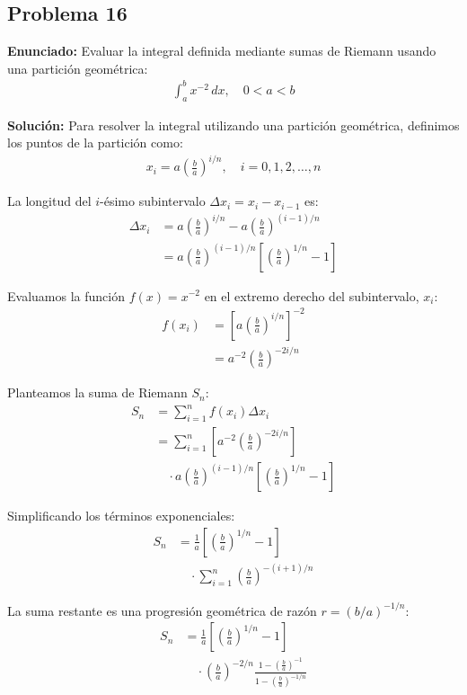 \subsection*{Problema 16}

\textbf{Enunciado:} Evaluar la integral definida 
mediante sumas de Riemann usando una partición geométrica:
\begin{align*}
\int_{a}^{b} x^{-2} \, dx, \quad 0 < a < b
\end{align*}

\textbf{Solución:} Para resolver la integral 
utilizando una partición geométrica, 
definimos los puntos de la partición como:
\begin{align*}
x_i = a \left(\frac{b}{a}\right)^{i/n}, \quad i = 0, 1, 2, \dots, n
\end{align*}

La longitud del $i$-ésimo subintervalo 
$\Delta x_i = x_i - x_{i-1}$ es:
\begin{align*}
\Delta x_i &= a \left(\frac{b}{a}\right)^{i/n} 
- a \left(\frac{b}{a}\right)^{(i-1)/n} \\
&= a \left(\frac{b}{a}\right)^{(i-1)/n} 
\left[ \left(\frac{b}{a}\right)^{1/n} - 1 \right]
\end{align*}

Evaluamos la función $f(x) = x^{-2}$ 
en el extremo derecho del subintervalo, $x_i$:
\begin{align*}
f(x_i) &= \left[ a \left(\frac{b}{a}\right)^{i/n} \right]^{-2} \\
&= a^{-2} \left(\frac{b}{a}\right)^{-2i/n}
\end{align*}

Planteamos la suma de Riemann $S_n$:
\begin{align*}
S_n &= \sum_{i=1}^{n} f(x_i) \Delta x_i \\
&= \sum_{i=1}^{n} \left[ a^{-2} \left(\frac{b}{a}\right)^{-2i/n} \right] \\
&\quad \cdot a \left(\frac{b}{a}\right)^{(i-1)/n} 
\left[ \left(\frac{b}{a}\right)^{1/n} - 1 \right]
\end{align*}

Simplificando los términos exponenciales:
\begin{align*}
S_n &= \frac{1}{a} \left[ \left(\frac{b}{a}\right)^{1/n} - 1 \right] \\
&\quad \cdot \sum_{i=1}^{n} \left(\frac{b}{a}\right)^{-(i+1)/n}
\end{align*}

La suma restante es una progresión geométrica 
de razón $r = (b/a)^{-1/n}$:
\begin{align*}
S_n &= \frac{1}{a} \left[ \left(\frac{b}{a}\right)^{1/n} - 1 \right] \\
&\quad \cdot \left(\frac{b}{a}\right)^{-2/n} 
\frac{1 - \left(\frac{b}{a}\right)^{-1}}{1 - \left(\frac{b}{a}\right)^{-1/n}}
\end{align*}

